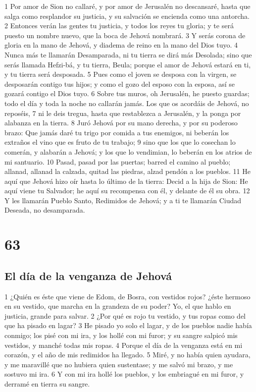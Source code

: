 1 Por amor de Sion no callaré, y por amor de Jerusalén no descansaré, hasta que salga como resplandor su justicia, y su salvación se encienda como una antorcha.
2 Entonces verán las gentes tu justicia, y todos los reyes tu gloria; y te será puesto un nombre nuevo, que la boca de Jehová nombrará.
3 Y serás corona de gloria en la mano de Jehová, y diadema de reino en la mano del Dios tuyo.
4 Nunca más te llamarán Desamparada, ni tu tierra se dirá más Desolada; sino que serás llamada Hefzi-bá, y tu tierra, Beula; porque el amor de Jehová estará en ti, y tu tierra será desposada.
5 Pues como el joven se desposa con la virgen, se desposarán contigo tus hijos; y como el gozo del esposo con la esposa, así se gozará contigo el Dios tuyo.
6 Sobre tus muros, oh Jerusalén, he puesto guardas; todo el día y toda la noche no callarán jamás. Los que os acordáis de Jehová, no reposéis,
7 ni le deis tregua, hasta que restablezca a Jerusalén, y la ponga por alabanza en la tierra.
8 Juró Jehová por su mano derecha, y por su poderoso brazo: Que jamás daré tu trigo por comida a tus enemigos, ni beberán los extraños el vino que es fruto de tu trabajo;
9 sino que los que lo cosechan lo comerán, y alabarán a Jehová; y los que lo vendimian, lo beberán en los atrios de mi santuario.
10 Pasad, pasad por las puertas; barred el camino al pueblo; allanad, allanad la calzada, quitad las piedras, alzad pendón a los pueblos.
11 He aquí que Jehová hizo oír hasta lo último de la tierra: Decid a la hija de Sion: He aquí viene tu Salvador; he aquí su recompensa con él, y delante de él su obra. 
12 Y les llamarán Pueblo Santo, Redimidos de Jehová; y a ti te llamarán Ciudad Deseada, no desamparada.

\chapter{63}

\section*{El día de la venganza de Jehová}

1 ¿Quién es éste que viene de Edom, de Bosra, con vestidos rojos? ¿éste hermoso en su vestido, que marcha en la grandeza de su poder? Yo, el que hablo en justicia, grande para salvar.
2 ¿Por qué es rojo tu vestido, y tus ropas como del que ha pisado en lagar?
3 He pisado yo solo el lagar, y de los pueblos nadie había conmigo; los pisé con mi ira, y los hollé con mi furor; y su sangre salpicó mis vestidos, y manché todas mis ropas. 
4 Porque el día de la venganza está en mi corazón, y el año de mis redimidos ha llegado.
5 Miré, y no había quien ayudara, y me maravillé que no hubiera quien sustentase; y me salvó mi brazo, y me sostuvo mi ira. 
6 Y con mi ira hollé los pueblos, y los embriagué en mi furor, y derramé en tierra su sangre.

